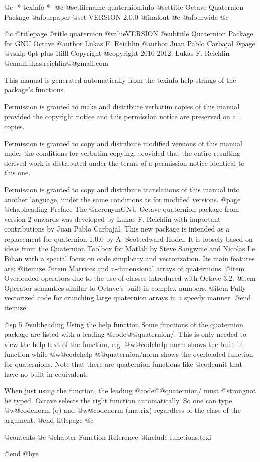    @c -*-texinfo-*-
@c %
@setfilename quaternion.info
@settitle Octave Quaternion Package
@afourpaper
@set VERSION 2.0.0
@finalout
@c @afourwide
@c %

@c %
@titlepage
@title quaternion @value{VERSION}
@subtitle Quaternion Package for GNU Octave
@author Lukas F. Reichlin
@author Juan Pablo Carbajal
@page
@vskip 0pt plus 1filll
Copyright @copyright{} 2010-2012, Lukas F. Reichlin @email{lukas.reichlin@@gmail.com}

This manual is generated automatically from the texinfo help strings
of the package's functions.

Permission is granted to make and distribute verbatim copies of
this manual provided the copyright notice and this permission notice
are preserved on all copies.

Permission is granted to copy and distribute modified versions of this
manual under the conditions for verbatim copying, provided that the entire
resulting derived work is distributed under the terms of a permission
notice identical to this one.

Permission is granted to copy and distribute translations of this manual
into another language, under the same conditions as for modified versions.
@page
@chapheading Preface
The @acronym{GNU} Octave quaternion package from version 2 onwards
was developed by Lukas F. Reichlin with important contributions by
Juan Pablo Carbajal. This new package is intended as a replacement
for quaternion-1.0.0 by A. Scottedward Hodel. It is loosely based
on ideas from the Quaternion Toolbox for Matlab by Steve Sangwine
and Nicolas Le Bihan with a special focus on code simplicity and
vectorization. Its main features are:
@itemize
@item Matrices and n-dimensional arrays of quaternions.
@item Overloaded operators due to the use of classes introduced with Octave 3.2.
@item Operator semantics similar to Octave's built-in complex numbers.
@item Fully vectorized code for crunching large quaternion arrays in a speedy manner.
@end itemize


@sp 5
@subheading Using the help function
Some functions of the quaternion package are listed with a leading @code{@@quaternion/}.
This is only needed to view the help text of the function, e.g. @w{@code{help norm}}
shows the built-in function while @w{@code{help @@quaternion/norm}} shows the overloaded
function for quaternions. Note that there are quaternion functions
like @code{unit} that have no built-in equivalent.

When just using the function, the leading @code{@@quaternion/} must @strong{not} be typed.
Octave selects the right function automatically. So one can type @w{@code{norm (q)}}
and @w{@code{norm (matrix)}} regardless of the class of the argument.
@end titlepage
@c %

@contents
@c @chapter Function Reference
@include functions.texi

@end
@bye
